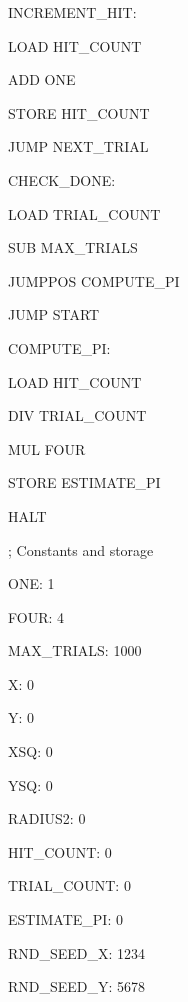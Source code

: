 \begin{tcolorbox}[title=Monte Carlo Simulation for \(\pi\), colback=gray!5, colframe=black]
  \ttfamily
  
  INCREMENT\_HIT:\par
  \quad LOAD HIT\_COUNT\par
  \quad ADD ONE\par
  \quad STORE HIT\_COUNT\par
  \quad JUMP NEXT\_TRIAL\par
  
  
\end{tcolorbox}

\begin{tcolorbox}[title=Monte Carlo Simulation for \(\pi\), colback=gray!5, colframe=black]
  \ttfamily
  
  CHECK\_DONE:\par
  \quad LOAD TRIAL\_COUNT\par
  \quad SUB MAX\_TRIALS\par
  \quad JUMPPOS COMPUTE\_PI\par
  \quad JUMP START\par
  
\end{tcolorbox}

\begin{tcolorbox}[title=Monte Carlo Simulation for \(\pi\), colback=gray!5, colframe=black]
  \ttfamily
  
  
  COMPUTE\_PI:\par
  \quad LOAD HIT\_COUNT\par
  \quad DIV TRIAL\_COUNT\par
  \quad MUL FOUR\par
  \quad STORE ESTIMATE\_PI\par
  \quad HALT\par
  
\end{tcolorbox}


\begin{tcolorbox}[title=Monte Carlo Simulation for \(\pi\), colback=gray!5, colframe=black]
  \ttfamily
  
  
  ; Constants and storage\par
  ONE:           1\par
  FOUR:          4\par
  MAX\_TRIALS:    1000\par
  X:             0\par
  Y:             0\par
  XSQ:           0\par
  YSQ:           0\par
  RADIUS2:       0\par
  HIT\_COUNT:     0\par
  TRIAL\_COUNT:   0\par
  ESTIMATE\_PI:   0\par
  RND\_SEED\_X:    1234\par
  RND\_SEED\_Y:    5678\par
  
\end{tcolorbox}


